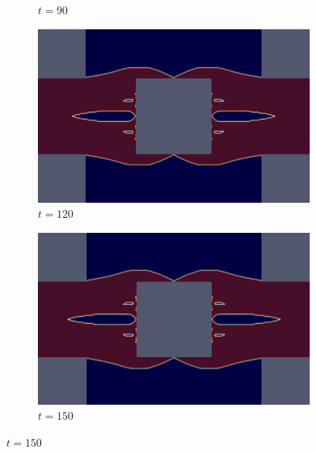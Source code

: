 \begin{figure}[H]
\begin{subfigure}{.4\textwidth}
        \caption{$t = 90$}
    \end{subfigure}
    \begin{subfigure}{.4\textwidth}
        \includegraphics[width=\textwidth]{imgs/HeatSink/seventh.png}
        \caption{$t = 120$}
    \end{subfigure}
    \begin{subfigure}{.4\textwidth}
        \includegraphics[width=\textwidth]{imgs/HeatSink/eighth.png}
        \caption{$t = 150$}
    \end{subfigure}
\end{figure}

\vfill\pagebreak

